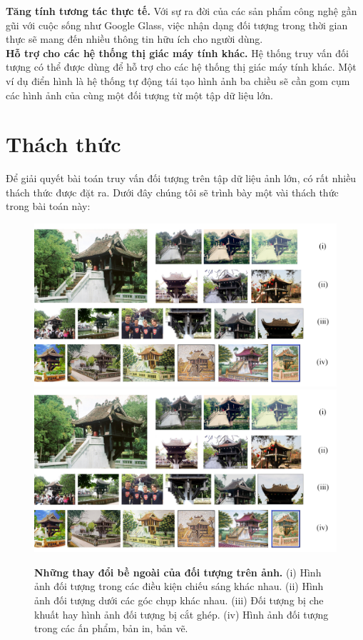 \textbf{Tăng tính tương tác thực tế.} Với sự ra đời của các sản phẩm công nghệ gần gũi với cuộc sống như Google Glass, việc nhận dạng đối tượng trong thời gian thực sẽ mang đến nhiều thông tin hữu ích cho người dùng.\\
\textbf{Hỗ trợ cho các hệ thống thị giác máy tính khác.} Hệ thống truy vấn đối tượng có thể được dùng để hỗ trợ cho các hệ thống thị giác máy tính khác. Một ví dụ điển hình là hệ thống tự động tái tạo hình ảnh ba chiều sẽ cần gom cụm các hình ảnh của cùng một đối tượng từ một tập dữ liệu lớn.\\
\section{Thách thức}
 Để giải quyết bài toán truy vấn đối tượng trên tập dữ liệu ảnh lớn, có rất nhiều thách thức được đặt ra. Dưới đây chúng tôi sẽ trình bày một vài thách thức trong bài toán này:\\
 \begin{figure}[!htbp]
  \begin{center}
    \leavevmode
    \ifpdf
      \includegraphics[scale=0.20]{chuaMotCot}
    \else
      \includegraphics[scale=0.20]{chuaMotCot}
    \fi
    \caption[Những thay đổi bề ngoài của đối tượng trên ảnh]{\textbf{Những thay đổi bề ngoài của đối tượng trên ảnh.} (i) Hình ảnh đối tượng trong các điều kiện chiếu sáng khác nhau. (ii) Hình ảnh đối tượng dưới các góc chụp khác nhau. (iii) Đối tượng bị che khuất hay hình ảnh đối tượng bị cắt ghép. (iv) Hình ảnh đối tượng trong các ấn phẩm, bản in, bản vẽ.}
    \label{FigTemple}
  \end{center}
\end{figure} 
